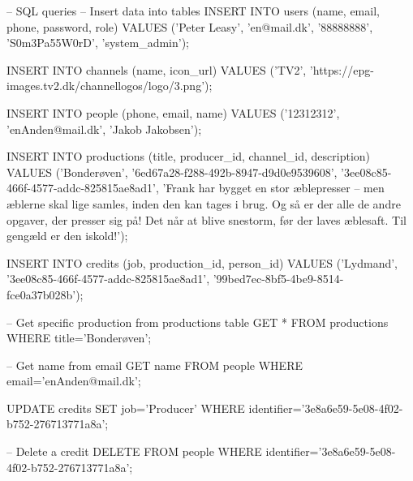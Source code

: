 \begin{code}[language=sql, caption=206 SQL.sql, firstnumber=87]
-- SQL queries
-- Insert data into tables
INSERT INTO users (name, email, phone, password, role)
VALUES ('Peter Leasy', 'en@mail.dk', '88888888', 'S0m3Pa55W0rD', 'system_admin'); 

INSERT INTO channels (name, icon_url)
VALUES ('TV2', 'https://epg-images.tv2.dk/channellogos/logo/3.png'); 

INSERT INTO people (phone, email, name)
VALUES ('12312312', 'enAnden@mail.dk', 'Jakob Jakobsen'); 

INSERT INTO productions (title, producer_id, channel_id, description)
VALUES ('Bonderøven', '6ed67a28-f288-492b-8947-d9d0e9539608', '3ee08c85-466f-4577-addc-825815ae8ad1', 'Frank har bygget en stor æblepresser – men æblerne skal lige samles, inden den kan tages i brug. Og så er der alle de andre opgaver, der presser sig på! Det når at blive snestorm, før der laves æblesaft. Til gengæld er den iskold!'); 

INSERT INTO credits (job, production_id, person_id)
VALUES ('Lydmand', '3ee08c85-466f-4577-addc-825815ae8ad1', '99bed7ec-8bf5-4be9-8514-fce0a37b028b'); 


-- Get specific production from productions table
GET * FROM productions WHERE title='Bonderøven';

-- Get name from email
GET name FROM people WHERE email='enAnden@mail.dk';

UPDATE credits SET job='Producer' WHERE identifier='3e8a6e59-5e08-4f02-b752-276713771a8a';

-- Delete a credit
DELETE FROM people WHERE identifier='3e8a6e59-5e08-4f02-b752-276713771a8a';
\end{code}
